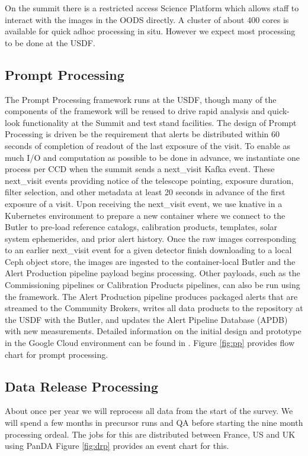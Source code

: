 \documentclass[11pt,twoside]{article}
\begin{document}
On the summit there is a restricted access Science Platform which allows staff to interact with the  images in the OODS directly.
A cluster of about 400 cores is available for quick adhoc processing in situ.
However we expect most processing to be done at the USDF.

\subsection{Prompt Processing} \label{sec:prompt}
The Prompt Processing framework runs at the USDF, though many of the components of the framework will be reused to drive rapid analysis and quick-look functionality at the Summit and test stand facilities.
The design of Prompt Processing is driven be the requirement that alerts be distributed within 60 seconds of completion of readout of the last exposure of the visit.
To enable as much I/O and computation as possible to be done in advance, we instantiate one process per CCD when the summit sends a next\_visit Kafka event.
These next\_visit events providing notice of the telescope pointing, exposure duration, filter selection, and other metadata at least 20 seconds in advance of the first exposure of a visit.
Upon receiving the next\_visit event, we use knative in a Kubernetes environment to prepare a new container where we connect to the Butler to pre-load reference catalogs, calibration products, templates, solar system ephemerides, and prior alert history.
Once the raw images corresponding to an earlier next\_visit event for a given detector finish downloading to a local Ceph object store, the images are ingested to the container-local Butler and the Alert Production pipeline payload begins processing.
Other payloads, such as the Commissioning pipelines or Calibration Products pipelines, can also be run using the framework.
The Alert Production pipeline produces packaged alerts that are streamed to the Community Brokers, writes all data products to the repository at the USDF with the Butler, and updates the Alert Pipeline Database (APDB) with new measurements.
Detailed information on the initial design and prototype in the Google Cloud environment can be found in \citet{DMTN-219}.
Figure \ref{fig:pp} provides flow chart for prompt processing.

\begin{centering}
\end{centering}

\subsection{Data Release Processing}\label{sec:DRP}
About once per year we will reprocess all data from the start of the survey.
We will spend a few months in precursor runs and QA before starting the nine month processing ordeal.
The jobs for this are distributed between France, US and UK using PanDA \citep{DMTN-213}
Figure \ref{fig:drp} provides an event chart for this.
\end{document}
